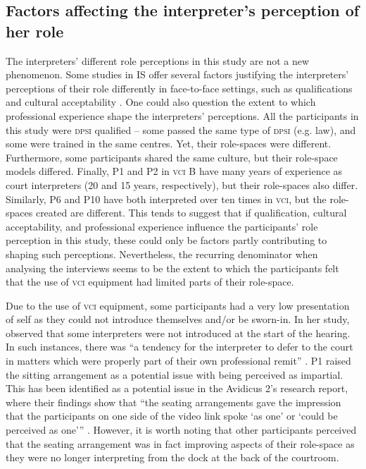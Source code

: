 \documentclass[output=paper]{langsci/langscibook}
\begin{document}
\subsection{Factors affecting the interpreter’s perception of her role}
The interpreters’ different role perceptions in this study are not a new phenomenon. Some studies in IS offer several factors justifying the interpreters’ perceptions of their role differently in face-to-face settings, such as qualifications \citep{Martin2008} and cultural acceptability \citep{Merlini2009}. One could also question the extent to which professional experience shape the interpreters’ perceptions. All the participants in this study were \textsc{dpsi} qualified -- some passed the same type of \textsc{dpsi} (e.g. law), and some were trained in the same centres. Yet, their role-spaces were different. Furthermore, some participants shared the same culture, but their role-space models differed. Finally, P1 and P2 in \textsc{vci} B have many years of experience as court interpreters (20 and 15 years, respectively), but their role-spaces also differ. Similarly, P6 and P10 have both interpreted over ten times in \textsc{vci}, but the role-spaces created are different. This tends to suggest that if qualification, cultural acceptability, and professional experience influence the participants’ role perception in this study, these could only be factors partly contributing to shaping such perceptions. Nevertheless, the recurring denominator when analysing the interviews seems to be the extent to which the participants felt that the use of \textsc{vci} equipment had limited parts of their role-space. 

Due to the use of \textsc{vci} equipment, some participants had a very low presentation of self as they could not introduce themselves and/or be sworn-in. In her study, \citet{Fowler2013} observed that some interpreters were not introduced at the start of the hearing. In such instances, there was “a tendency for the interpreter to defer to the court in matters which were properly part of their own professional remit” \citep[245]{Fowler2013}. P1 raised the sitting arrangement as a potential issue with being perceived as impartial. This has been identified as a potential issue in the Avidicus 2’s research report, where their findings show that “the seating arrangements gave the impression that the participants on one side of the video link spoke ‘as one’ or ‘could be perceived as one’” \citep[53]{Braun2013}. However, it is worth noting that other participants perceived that the seating arrangement was in fact improving aspects of their role-space as they were no longer interpreting from the dock at the back of the courtroom.
\end{document}
